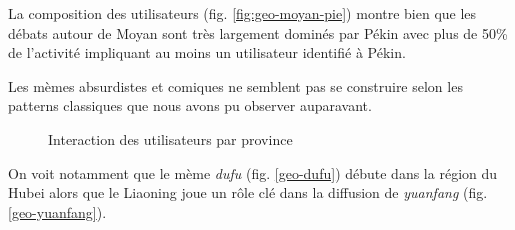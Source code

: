 La composition des utilisateurs (fig. \ref{fig:geo-moyan-pie}) montre bien que les débats autour de Moyan sont très largement dominés par Pékin avec plus de 50\% de l{\textquoteright}activité impliquant au moins un utilisateur identifié \`a Pékin.

Les mèmes absurdistes et comiques ne semblent pas se construire selon les patterns classiques que nous avons pu observer auparavant.

\begin{figure}[h!]
    \centering
    \caption{
        Interaction des utilisateurs par province
    }
\end{figure}


On voit notamment que le mème \textit{dufu } (fig. \ref{geo-dufu}) débute dans la région du Hubei alors que le Liaoning joue un r\^ole clé dans la diffusion de \textit{yuanfang} (fig. \ref{geo-yuanfang}). 

